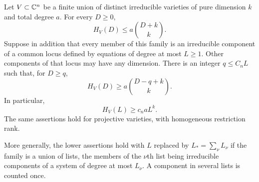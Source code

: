 \begin{lemma}\label{poly:hilbert}
Let $V\subset\mathbb C^n$ be a finite union of distinct irreducible varieties
of pure dimension $k$ and total degree $a$.  For every $D\ge0$,
\begin{equation}\label{poly:hilbert-upper}
 H_V(D)\le a\binom{D+k}{k}.
\end{equation}
Suppose in addition that every member of this family is an irreducible
component of a common locus defined by equations of degree at most
$L\ge1$.  Other components of that locus may have any dimension.  There
is an integer $q\le C_nL$ such that, for $D\ge q$,
\begin{equation}\label{poly:hilbert-lower}
 H_V(D)\ge a\binom{D-q+k}{k}.
\end{equation}
In particular,
\begin{equation}\label{poly:hilbert-at-L}
 H_V(L)\ge c_n aL^k.
\end{equation}
The same assertions hold for projective varieties, with homogeneous
restriction rank.

More generally, the lower assertions hold with $L$ replaced by
$L_* =\sum_\nu L_\nu$ if the family is a union of lists, the members of
the $\nu$th list being irreducible components of a system of degree at
most $L_\nu$.  A component in several lists is counted once.
\end{lemma}

